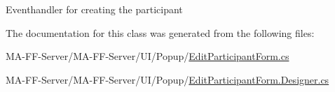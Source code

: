 Eventhandler for creating the participant 



The documentation for this class was generated from the following files\+:\begin{DoxyCompactItemize}
\item 
M\+A-\/\+F\+F-\/\+Server/\+M\+A-\/\+F\+F-\/\+Server/\+U\+I/\+Popup/\hyperlink{_edit_participant_form_8cs}{Edit\+Participant\+Form.\+cs}\item 
M\+A-\/\+F\+F-\/\+Server/\+M\+A-\/\+F\+F-\/\+Server/\+U\+I/\+Popup/\hyperlink{_edit_participant_form_8_designer_8cs}{Edit\+Participant\+Form.\+Designer.\+cs}\end{DoxyCompactItemize}
